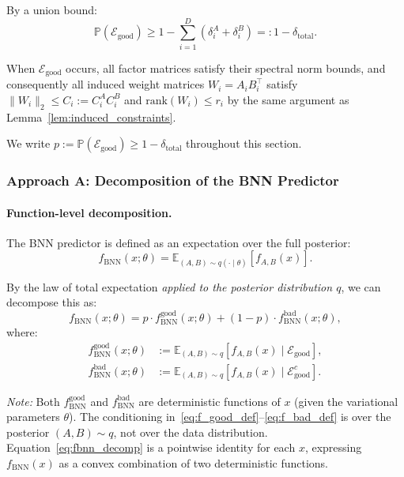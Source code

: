 \documentclass{article}
\theoremstyle{plain}
\theoremstyle{definition}
\theoremstyle{remark}
\begin{document}
By a union bound:
\begin{equation}
    \mathbb{P}(\mathcal{E}_{\text{good}}) \geq 1 - \sum_{i=1}^{D} (\delta_i^A + \delta_i^B) =: 1 - \delta_{\text{total}}.
\end{equation}

When $\mathcal{E}_{\text{good}}$ occurs, all factor matrices satisfy their spectral norm bounds, and consequently all induced weight matrices $W_i = A_i B_i^\top$ satisfy $\|W_i\|_2 \leq C_i := C_i^A C_i^B$ and $\mathrm{rank}(W_i) \leq r_i$ by the same argument as Lemma~\ref{lem:induced_constraints}.

We write $p := \mathbb{P}(\mathcal{E}_{\text{good}}) \ge 1 - \delta_{\text{total}}$ throughout this section.

\subsubsection{Approach A: Decomposition of the BNN Predictor}\label{sec:approach_a}

\paragraph{Function-level decomposition.}
The BNN predictor is defined as an expectation over the full posterior:
\begin{equation}
    f_{\mathrm{BNN}}(x; \theta) = \mathbb{E}_{(A,B) \sim q(\cdot\mid\theta)}[f_{A,B}(x)].
\end{equation}

By the law of total expectation \emph{applied to the posterior distribution $q$}, we can decompose this as:
\begin{equation}\label{eq:fbnn_decomp}
    f_{\mathrm{BNN}}(x; \theta) = p \cdot f_{\mathrm{BNN}}^{\text{good}}(x; \theta) + (1-p) \cdot f_{\mathrm{BNN}}^{\text{bad}}(x; \theta),
\end{equation}
where:
\begin{align}
    f_{\mathrm{BNN}}^{\text{good}}(x; \theta) &:= \mathbb{E}_{(A,B)\sim q}[f_{A,B}(x) \mid \mathcal{E}_{\text{good}}], \label{eq:f_good_def} \\
    f_{\mathrm{BNN}}^{\text{bad}}(x; \theta) &:= \mathbb{E}_{(A,B)\sim q}[f_{A,B}(x) \mid \mathcal{E}_{\text{good}}^c]. \label{eq:f_bad_def}
\end{align}

\emph{Note:} Both $f_{\mathrm{BNN}}^{\text{good}}$ and $f_{\mathrm{BNN}}^{\text{bad}}$ are deterministic functions of $x$ (given the variational parameters $\theta$). The conditioning in~\eqref{eq:f_good_def}--\eqref{eq:f_bad_def} is over the posterior $(A,B)\sim q$, not over the data distribution. Equation~\eqref{eq:fbnn_decomp} is a pointwise identity for each $x$, expressing $f_{\mathrm{BNN}}(x)$ as a convex combination of two deterministic functions.
\end{document}
